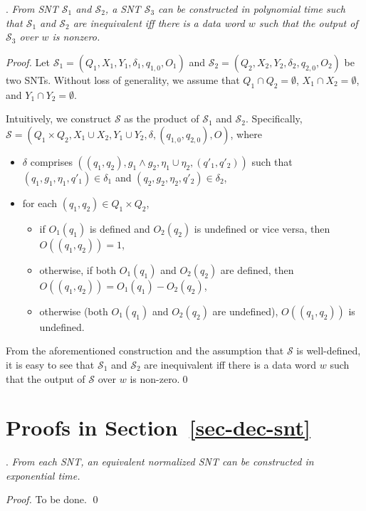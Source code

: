 \documentclass[runningheads,a4paper]{llncs}
\def\Ss{{\mathcal{S} }}
\begin{document}
\begin{appendix}
.
\emph{From SNT $\Ss_1$ and $\Ss_2$, a SNT $\Ss_3$ can be constructed in polynomial time such that $\Ss_1$ and $\Ss_2$ are  inequivalent iff there is a data word $w$ such that the output of $\Ss_3$ over $w$ is nonzero.}

\begin{proof}
Let $\Ss_1 = (Q_1,X_1,Y_1,\delta_1,q_{1,0}, O_1)$ and  $\Ss_2 = (Q_2,X_2,Y_2,\delta_2,q_{2,0}, O_2)$ be two SNTs. Without loss of generality, we assume that $Q_1 \cap Q_2 = \emptyset$, $X_1 \cap X_2 = \emptyset$, and $Y_1 \cap Y_2 = \emptyset$. 

Intuitively, we construct $\Ss$ as the product of $\Ss_1$ and $\Ss_2$. Specifically, $\Ss=(Q_1 \times Q_2, X_1 \cup X_2, Y_1 \cup Y_2, \delta, (q_{1,0},q_{2,0}), O)$, where
\begin{itemize}
\item $\delta$ comprises $((q_1,q_2), g_1 \wedge g_2, \eta_1 \cup \eta_2, (q'_1,q'_2))$ such that $(q_1,g_1,\eta_1,q'_1) \in \delta_1$ and $(q_2,g_2,\eta_2,q'_2) \in \delta_2$,
%
\item for each $(q_1,q_2) \in Q_1 \times Q_2$, 
\begin{itemize}
\item if $O_1(q_1)$ is defined and $O_2(q_2)$ is undefined or vice versa, then $O((q_1,q_2))=1$, 
%
\item otherwise, if both $O_1(q_1)$ and $O_2(q_2)$ are defined, then $O((q_1,q_2))=O_1(q_1) - O_2(q_2)$, 
%
\item otherwise (both $O_1(q_1)$ and $O_2(q_2)$ are undefined), $O((q_1,q_2))$ is undefined. 
\end{itemize}
\end{itemize}
From the aforementioned construction and the assumption that $\Ss$ is well-defined, it is easy to see that $\Ss_1$ and $\Ss_2$ are  inequivalent iff there is a data word $w$ such that the output of $\Ss$ over $w$ is non-zero.\qed
\end{proof}


\section{Proofs in Section~\ref{sec-dec-snt}}


.
{\it From each SNT, an equivalent normalized SNT can be constructed in exponential time.} 

\smallskip

\begin{proof}
To be done.
\qed
\end{proof}



\end{appendix}
\end{document}
